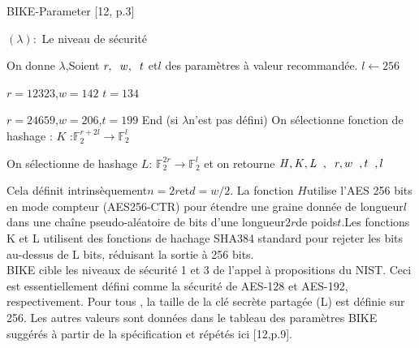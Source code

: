 \documentclass[12pt,openany]{report}
\begin{document}
\begin{algorithm}
\caption{BIKE-Parameter [12, p.3]}
\label{alg:cap1}
\begin{algorithmic}[1]
\Require $(\lambda):$ Le niveau de sécurité
        
\State On donne $\lambda$,Soient $r,\hspace{0.2cm}w,\hspace{0.2cm}t$ et$l$ des paramètres à valeur recommandée. $ l \gets 256$


    \State $r=12323$\hspace{0.2cm},$w=142$\hspace{0.2cm} $t=134$
   
\EndIf
{} 
\State $r=24659$,\hspace{0.2cm}$w=206$\hspace{0.2cm},$t=199$
\Else
    \State End \Comment(si $\lambda$n'est pas défini)
 \State \EndIf
\State On sélectionne  fonction de hashage :
  $\mathit{K}$ :$\mathbb{F}^{r+2l}_2\rightarrow \mathbb{F}^l_2$
  
\State On sélectionne de hashage  $ \mathit{L}$: $\mathbb{F}^{2r}_2\longrightarrow \mathbb{F}^l_2$ et on retourne $\mathit{H},\mathit{K},\mathit{L}\hspace{0.2cm},\hspace{0.2cm}r,w\hspace{0.2cm},t\hspace{0.2cm},l$



   
 
\end{algorithmic}

\end{algorithm}

Cela définit intrinsèquement$
 n = 2r$et$d = w/2$.
La fonction  $\mathit{H}$utilise l’AES 256 bits en mode compteur (AES256-CTR) pour étendre
une graine donnée de longueur$l$dans une chaîne pseudo-aléatoire de bits d’une longueur$2r$de poids$
t$.Les fonctions K et L utilisent des fonctions de hachage SHA384 standard pour rejeter les bits
au-dessus de L bits, réduisant la sortie à 256 bits.\\
BIKE cible les niveaux de sécurité 1 et 3 de l’appel à propositions du NIST. Ceci
est essentiellement défini comme la sécurité de AES-128 et AES-192, respectivement. Pour tous
, la taille de la clé secrète partagée (L) est définie sur 256. Les autres valeurs sont
données dans le tableau des paramètres BIKE suggérés à partir de la spécification et répétés
ici [12,p.9].\\
\end{document}

